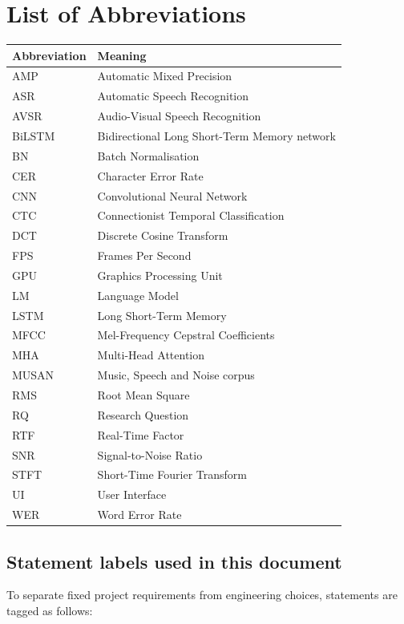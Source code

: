 \section*{List of Abbreviations}

\begin{longtable}{@{}p{}p{}@{}}
\toprule
\textbf{Abbreviation} & \textbf{Meaning} \\
\midrule
\endhead
AMP      & Automatic Mixed Precision \\
ASR      & Automatic Speech Recognition \\
AVSR     & Audio-Visual Speech Recognition \\
BiLSTM   & Bidirectional Long Short-Term Memory network \\
BN       & Batch Normalisation \\
CER      & Character Error Rate \\
CNN      & Convolutional Neural Network \\
CTC      & Connectionist Temporal Classification \\
DCT      & Discrete Cosine Transform \\
FPS      & Frames Per Second \\
GPU      & Graphics Processing Unit \\
LM       & Language Model \\
LSTM     & Long Short-Term Memory \\
MFCC     & Mel-Frequency Cepstral Coefficients \\
MHA      & Multi-Head Attention \\
MUSAN    & Music, Speech and Noise corpus \\
RMS      & Root Mean Square \\
RQ       & Research Question \\
RTF      & Real-Time Factor \\
SNR      & Signal-to-Noise Ratio \\
STFT     & Short-Time Fourier Transform \\
UI       & User Interface \\
WER      & Word Error Rate \\
\bottomrule
\end{longtable}

\subsection*{Statement labels used in this document}
To separate fixed project requirements from engineering choices, statements
are tagged as follows:

